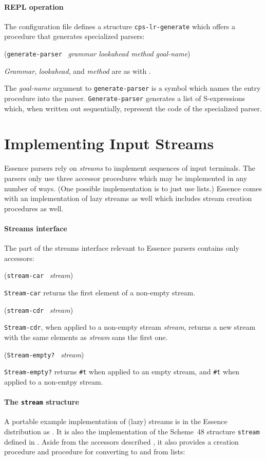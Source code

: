 \documentclass{article}
\renewcommand{\var}[1]{\noindent\mbox{\textit{#1}}}
\newcommand{\ide}[1]{{\frenchspacing\textnormal{\texttt{#1}}}}
\newcommand{\pproto}[2]{\unskip%
\mbox{\texonly{\spaceskip=0.5em}#1}%
\mbox{ }\texonly{\nobreak}\htmlonly{ }\textrm{#2}}
\newcommand{\proto}[3]{\par\bigskip\begin{flushleft}\pproto{(\texttt{#1}}{\textit{#2})}\hspace*{\fill}{#3}\end{flushleft}}
\newcommand{\codefont}[1]{\texttt{#1}}
\begin{document}
\paragraph{REPL operation}
The  configuration file defines a
structure \codefont{cps-lr-generate} which offers a procedure that
generates specialized parsers:

\proto{generate-parser}{grammar lookahead method goal-name}{procedure}
%
\var{Grammar}, \var{lookahead}, and \var{method} are as with
\link{\codefont{parse}}{proc:parse}.

The \var{goal-name} argument to \ide{generate-parser} is a symbol
which names the entry procedure into the parser.
\ide{Generate-parser} generates a list of S-expressions which, when
written out sequentially, represent the code of the specialized
parser.

\section{Implementing Input Streams}
\label{sec:streams}

Essence parsers rely on \textit{streams} to implement sequences of
input terminals.  The parsers only use three accessor procedures which 
may be implemented in any number of ways.  (One possible
implementation is to just use lists.)  Essence comes with an
implementation of lazy streams as well which includes stream creation
procedures as well.

\paragraph{Streams interface}
\label{sec:streams-accessors}

The part of the streams interface relevant to Essence parsers contains 
only accessors:

\proto{stream-car}{stream}{procedure}
%
\ide{Stream-car} returns the first element of a non-empty stream.

\proto{stream-cdr}{stream}{procedure}
%
\ide{Stream-cdr}, when applied to a non-empty stream \var{stream},
returns a new stream with the same elements as \var{stream} sans the
first one.

\proto{Stream-empty?}{stream}{procedure}
%
\ide{Stream-empty?} returns \codefont{\#t} when applied to an empty
stream, and \codefont{\#t} when applied to a non-emtpy stream.

\paragraph{The \codefont{stream} structure}
A portable example implementation of (lazy) streams is in the Essence
distribution as .  It is also the
implementation of the Scheme~48 structure \codefont{stream} defined in
.  Aside from the accessors described
, it also provides a creation
procedure and procedure for converting to and from lists:
\end{document}
